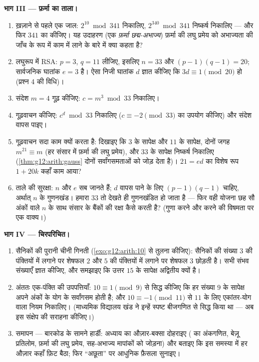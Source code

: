 \begin{problem}
\medskip
\noindent\textbf{भाग III --- फ़र्मा का ताला।}
\begin{enumerate}[resume]
  \item ख़ज़ाने से पहले एक जाल: $2^{10} \bmod 341$ निकालिए, $2^{340} \bmod 341$ निष्कर्ष निकालिए ---
        और फिर $341$ का  कीजिए। यह उदाहरण (एक \emph{फ़र्मा
        छद्म-अभाज्य}) फ़र्मा की लघु प्रमेय को अभाज्यता की जाँच के रूप में
        काम में लाने के बारे में क्या कहता है?
  \item लघुरूप में RSA: $p = 3$, $q = 11$ लीजिए, इसलिए $n = 33$ और $(p-1)(q-1) = 20$; सार्वजनिक
        घातांक $e = 3$ है। ऐसा निजी घातांक $d$ ज्ञात कीजिए कि $3d \equiv 1 \pmod{20}$ हो
        (प्रश्न 4 की विधि)।
  \item संदेश $m = 4$ गूढ़ कीजिए: $c = m^3 \bmod 33$ निकालिए।
  \item गूढ़वाचन कीजिए: $c^d \bmod 33$ निकालिए ($c \equiv -2 \pmod{33}$ का उपयोग कीजिए) और संदेश वापस
        पाइए।
  \item गूढ़वाचन सदा काम क्यों करता है: दिखाइए कि $3$ के सापेक्ष और $11$
        के सापेक्ष, दोनों जगह $m^{21} \equiv m$ (हर संसार में फ़र्मा की लघु प्रमेय), और
        $33$ के सापेक्ष निष्कर्ष निकालिए (\cref{thm:g12:arith:gauss} दोनों सर्वांगसमताओं को जोड़
        देता है)। $21 = ed$ का विशेष रूप $1 + 20k$ कहाँ काम आया?
  \item ताले की सुरक्षा: $n$ और $e$ सब जानते हैं; $d$ वापस पाने के लिए
        $(p-1)(q-1)$ चाहिए, अर्थात् $n$ के गुणनखंड। हमारा $33$ तो देखते ही
        गुणनखंडित हो जाता है --- फिर वही योजना छह सौ अंकों वाले $n$ के साथ
        संसार के बैंकों की रक्षा कैसे करती है? (गुणा करने और  करने
        की विषमता पर एक वाक्य।)
\end{enumerate}

\medskip
\noindent\textbf{भाग IV --- चिरपरिचित।}
\begin{enumerate}[resume]
  \item सैनिकों की पुरानी चीनी गिनती (\cref{exo:g12:arith:10} से तुलना कीजिए): सैनिकों की
        संख्या $3$ की पंक्तियों में लगाने पर शेषफल $2$ और $5$ की
        पंक्तियों में लगाने पर शेषफल $3$ छोड़ती है। सभी संभव संख्याएँ
        ज्ञात कीजिए, और समझाइए कि उत्तर $15$ के सापेक्ष अद्वितीय क्यों है।
  \item अंततः एक-पंक्ति की उपपत्तियाँ: $10 \equiv 1 \pmod 9$ से सिद्ध कीजिए कि हर संख्या
        $9$ के सापेक्ष अपने अंकों के योग के सर्वांगसम होती है; और $10 \equiv -1 \pmod{11}$
        से $11$ के लिए एकांतर-योग वाला नियम निकालिए। (माध्यमिक विद्यालय
        खंड ने इन्हें स्पष्ट बीजगणित से सिद्ध किया था --- अब इस संक्षेप की
        सराहना कीजिए।)
  \item समापन --- बारकोड के सामने हार्डी: अध्याय का औज़ार-बक्सा दोहराइए
        ( का अंकगणित, बेज़ू प्रतिलोम, फ़र्मा की लघु प्रमेय,
        सह-अभाज्य मापांकों को जोड़ना) और बताइए कि इस समस्या में हर औज़ार
        कहाँ फ़िट बैठा; फिर ``अछूता'' पर आधुनिक फ़ैसला सुनाइए।
\end{enumerate}
\end{problem}
